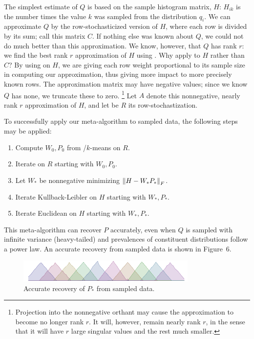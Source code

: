 \documentclass[conference]{IEEEtran}
\begin{document}
The simplest estimate of $Q$ is based on the sample histogram matrix, $H$:
$H_{ik}$ is the number times the value $k$ was sampled from the distribution $q_i$.
We can approximate $Q$ by the row-stochasticized version of $H$, where each row is divided by its sum;
call this matrix $C$.
If nothing else was known about $Q$, we could not do much better than this approximation.
We know, however, that $Q$ has rank $r$:
we find the best rank $r$ approximation of $H$ using .
Why apply  to $H$ rather than $C$?
By using  on $H$, we are giving each row weight proportional to its sample size in computing our approximation, thus giving more impact to more precisely known rows.
The  approximation matrix may have negative values;
since we know $Q$ has none, we truncate these to zero.%
\footnote{Projection into the nonnegative orthant may cause the approximation to become no longer rank $r$. It will, however, remain nearly rank $r$, in the sense that it will have $r$ large singular values and the rest much smaller.}
Let $A$ denote this nonnegative, nearly rank $r$ approximation of $H$, and let be $R$ its row-stochastization.

To successfully apply our meta-algorithm to sampled data, the following steps may be applied:
\begin{enumerate}
  \item Compute $W_0,P_0$ from /$k$-means on $R$.
  \item Iterate  on $R$ starting with $W_0,P_0$.
  \item Let $W_*$ be nonnegative minimizing ${\lVert H - W_* P_*\rVert}_F$. 
  \item Iterate Kullback-Leibler on $H$ starting with $W_*,P_*$.
  \item Iterate Euclidean on $H$ starting with $W_*,P_*$.
\end{enumerate}
This meta-algorithm can recover $P$ accurately, even when $Q$ is sampled with infinite variance (heavy-tailed) and prevalences of constituent distributions follow a power law.
An accurate recovery from sampled data is shown in Figure~6.

\begin{figure}[t]
\begin{center}
\includegraphics[width=3.5in]{synth/S_nmf}
\end{center}
\vspace{-0.7em}
\caption{Accurate recovery of $P_*$ from sampled data.}
\vspace{-1em}
\end{figure}
\end{document}

